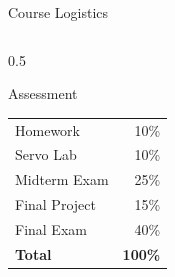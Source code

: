 \begin{frame}{Course Logistics}
    
    \begin{columns}
        \begin{column}{0.5\textwidth}
            \begin{block}{Assessment}
                \centering
                \begin{tabular}{lr}
                    Homework      & 10\% \\
                    Servo Lab     & 10\% \\
                    \alert{Midterm Exam}  & \alert{25\%} \\
                    Final Project & 15\% \\
                    \alert{Final Exam} & \alert{40\%} \\
                    \midrule
                    \textbf{Total} & \textbf{100\%} \\
                \end{tabular}
            \end{block}
        \end{column}
    \end{columns}
    
\end{frame}